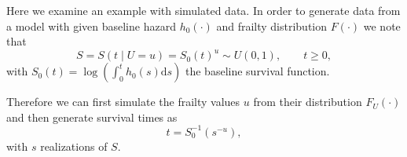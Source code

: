 Here we examine an example with simulated data.
In order to generate data from a model with given 
  baseline hazard $h_0(\cdot)$ and
  frailty distribution $F(\cdot)$
  we note that %
\begin{equation*}
  S = S(t \mid U = u) = S_0(t)^u \sim U(0, 1),
  \qquad t \ge 0,
\end{equation*}
  with $S_0(t) = \log\left(\int_0^t h_0(s) \mathrm d s\right)$ the baseline survival function.

Therefore we can first simulate the frailty values $u$ from their distribution $F_U(\cdot)$
  and then generate survival times as
\begin{equation*}
  t = S_0^{-1}(s^{-u}),
\end{equation*}
  with $s$ realizations of $S$.
  
  